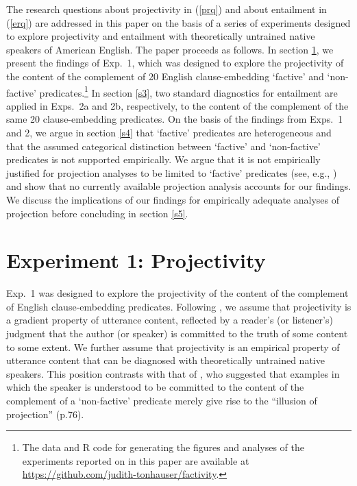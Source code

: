 \documentclass[11pt,fleqn]{article}
\newcommand{\6}{\mbox{$[\hspace*{-.6mm}[$}}
\newcommand{\9}{\mbox{$]\hspace*{-.6mm}]$}}
\begin{document}
The research questions about projectivity in (\ref{prq}) and about entailment in (\ref{erq}) are addressed in this paper on the basis of a series of experiments designed to explore projectivity and entailment with theoretically untrained native speakers of American English. The paper proceeds as follows. In section \ref{s2}, we present the findings of Exp.~1, which was designed to explore the projectivity of the content of the complement of 20 English clause-embedding `factive' and `non-factive' predicates.\footnote{\label{f-github}The
data and R code for generating the figures and analyses of the experiments reported on in this paper are available at \url{https://github.com/judith-tonhauser/factivity}.}  In section \ref{s3}, two standard diagnostics for entailment are applied in Exps.~2a and 2b, respectively, to the content of the complement of the same 20 clause-embedding predicates. On the basis of the findings from Exps.~1 and 2, we argue in section \ref{s4} that `factive' predicates are heterogeneous and that the assumed categorical distinction between `factive' and `non-factive' predicates is not supported empirically. We argue that it is not empirically justified for projection analyses to be limited to `factive' predicates (see, e.g., \citealt{heim83,vds92,abrusan2011,abrusan2016,romoli2015,best-question}) and show that no currently available projection analysis accounts for our findings. We discuss the implications of our findings for empirically adequate analyses of projection before concluding in section \ref{s5}.




\section{Experiment 1: Projectivity}\label{s2}

Exp.~1 was designed to explore the projectivity of the content of the complement of English clause-embedding predicates. Following \citealt{tbd-variability}, we assume that projectivity is a gradient property of utterance content, reflected by a reader's (or listener's) judgment that the author (or speaker) is committed to the truth of some content to some extent.  We further assume that projectivity is an empirical property of utterance content that can be diagnosed with theoretically untrained native speakers. This position contrasts with that of \citet{anand-hacquard2014}, who suggested that examples in which the speaker is understood to be committed to the content of the complement of a `non-factive' predicate merely give rise to the ``illusion of projection'' (p.76). 
\end{document}
